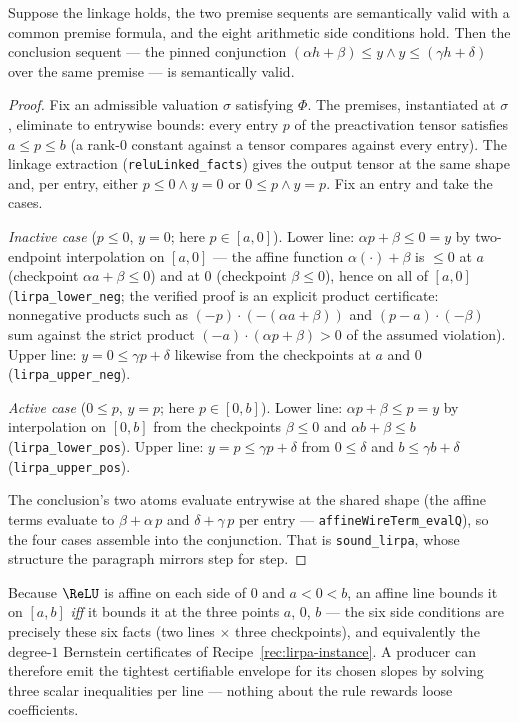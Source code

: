 \begin{bprop}\label{prop:lirpa-sound}
Suppose the linkage holds, the two premise sequents are semantically
valid with a common premise formula, and the eight arithmetic side
conditions hold. Then the conclusion sequent --- the pinned conjunction
$(\alpha h + \beta) \leq y \wedge y \leq (\gamma h + \delta)$ over the
same premise --- is semantically valid.
\end{bprop}
\begin{proof}
Fix an admissible valuation $\sigma$ satisfying $\Phi$. The premises,
instantiated at $\sigma$, eliminate to entrywise bounds: every entry
$p$ of the preactivation tensor satisfies $a \leq p \leq b$ (a
rank-$0$ constant against a tensor compares against every entry). The
linkage extraction (\texttt{reluLinked\_facts}) gives the output
tensor at the same shape and, per entry, either $p \leq 0 \wedge y =
0$ or $0 \leq p \wedge y = p$. Fix an entry and take the cases.

\emph{Inactive case} ($p \leq 0$, $y = 0$; here $p \in [a, 0]$).
Lower line: $\alpha p + \beta \leq 0 = y$ by two-endpoint
interpolation on $[a, 0]$ --- the affine function $\alpha({\cdot}) +
\beta$ is $\leq 0$ at $a$ (checkpoint $\alpha a + \beta \leq 0$) and
at $0$ (checkpoint $\beta \leq 0$), hence on all of $[a, 0]$
(\texttt{lirpa\_lower\_neg}; the verified proof is an explicit product
certificate: nonnegative products such as $(-p)\cdot(-(\alpha a +
\beta))$ and $(p - a)\cdot(-\beta)$ sum against the strict product
$(-a)\cdot(\alpha p + \beta) > 0$ of the assumed violation). Upper
line: $y = 0 \leq \gamma p + \delta$ likewise from the checkpoints at
$a$ and $0$ (\texttt{lirpa\_upper\_neg}).

\emph{Active case} ($0 \leq p$, $y = p$; here $p \in [0, b]$). Lower
line: $\alpha p + \beta \leq p = y$ by interpolation on $[0, b]$ from
the checkpoints $\beta \leq 0$ and $\alpha b + \beta \leq b$
(\texttt{lirpa\_lower\_pos}). Upper line: $y = p \leq \gamma p +
\delta$ from $0 \leq \delta$ and $b \leq \gamma b + \delta$
(\texttt{lirpa\_upper\_pos}).

The conclusion's two atoms evaluate entrywise at the shared shape (the
affine terms evaluate to $\beta + \alpha\,p$ and $\delta + \gamma\,p$
per entry --- \texttt{affineWireTerm\_evalQ}), so the four cases
assemble into the conjunction. That is \texttt{sound\_lirpa}, whose
structure the paragraph mirrors step for step.
\end{proof}

\begin{bremark}\label{rem:lirpa-checkpoints}
Because $\ReLU$ is affine on each side of $0$ and $a < 0 < b$, an
affine line bounds it on $[a, b]$ \emph{iff} it bounds it at the three
points $a$, $0$, $b$ --- the six side conditions are precisely these
six facts (two lines $\times$ three checkpoints), and equivalently the
degree-$1$ Bernstein certificates of Recipe~\ref{rec:lirpa-instance}.
A producer can therefore emit the tightest certifiable envelope for
its chosen slopes by solving three scalar inequalities per line ---
nothing about the rule rewards loose coefficients.
\end{bremark}

